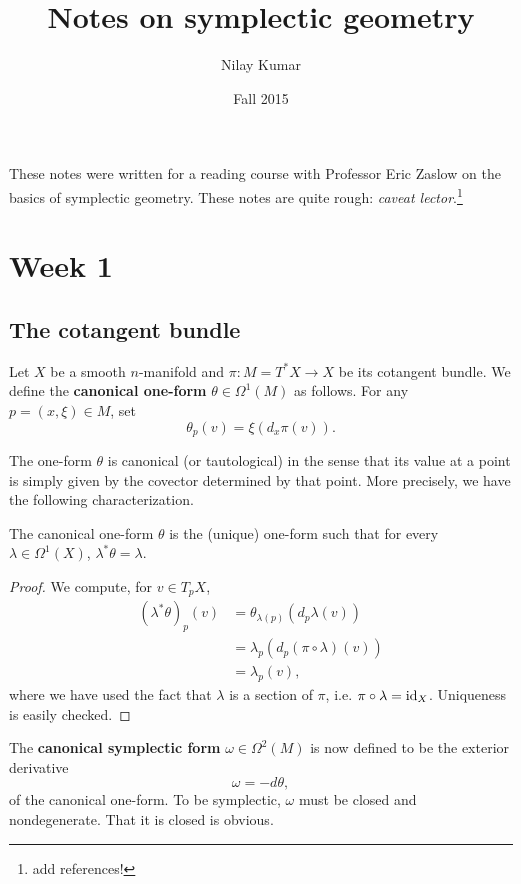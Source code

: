 \documentclass{amsart}
\title{Notes on symplectic geometry}
\author{Nilay Kumar}
\date{Fall 2015}
\begin{document}
\maketitle
\tableofcontents

These notes were written for a reading course with Professor Eric Zaslow on
the basics of symplectic geometry.
These notes are quite rough: \textit{caveat lector}.\footnote{add references!}

\section{Week 1}

\subsection{The cotangent bundle}

\begin{definition}
Let $X$ be a smooth $n$-manifold and $\pi:M=T^*X\to X$ be its cotangent bundle. We define the
\textbf{canonical one-form} $\theta\in\Omega^1(M)$ as follows. For any $p=(x,\xi)\in M$,
set
\begin{equation*}
    \theta_p(v)=\xi( d_x\pi(v)).
\end{equation*}
\end{definition}

The one-form $\theta$ is canonical (or tautological) in the sense that its value at a point
is simply given by the covector determined by that point. More precisely, we have the following
characterization.

\begin{proposition}
    The canonical one-form $\theta$ is the (unique) one-form such that for every $\lambda\in\Omega^1(X)$,
    $\lambda^*\theta=\lambda$.
    \label{prop:can}
\end{proposition}
\begin{proof}
    We compute, for $v\in T_pX$,
    \begin{align*}
        (\lambda^*\theta)_p(v) &= \theta_{\lambda(p)}(d_p\lambda(v)) \\
        &= \lambda_p(d_p(\pi\circ\lambda)(v)) \\
        &= \lambda_p(v),
    \end{align*}
    where we have used the fact that $\lambda$ is a section of $\pi$, i.e. $\pi\circ\lambda=\operatorname{id}_X$.
    Uniqueness is easily checked.
\end{proof}

\begin{definition}
    The \textbf{canonical symplectic form} $\omega\in\Omega^2(M)$ is now defined to be the exterior
    derivative
    \begin{equation*}
        \omega = - d\theta,
    \end{equation*}
    of the canonical one-form. To be symplectic, $\omega$ must be closed and nondegenerate. That it
    is closed is obvious.
\end{definition}
\end{document}
